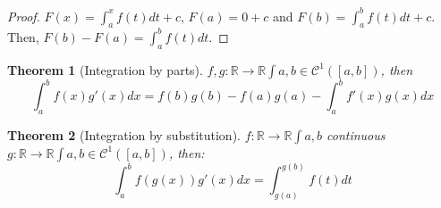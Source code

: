 \documentclass{article}
\newcommand{\fOnR}[1]{#1 : \mathbb{R} \rightarrow \mathbb{R}}
\newcommand{\intcc}[1]{\left[#1\right]}
\theoremstyle{definition}
\theoremstyle{definition}
\theoremstyle{plain}
\newtheorem{theorem}{Theorem}[section]
\theoremstyle{plain}
\theoremstyle{plain}
\theoremstyle{plain}
\theoremstyle{definition}
\theoremstyle{remark}
\theoremstyle{remark}
\theoremstyle{remark}
\theoremstyle{remark}
\newcommand{\C}{\mathcal{C}}
\begin{document}
\begin{proof}
  $F(x) = \int_a^x f(t) dt + c$, $F(a) = 0 + c$ and $F(b) = \int_a^b f(t) dt + c$. Then, $F(b) - F(a) = \int_a^b f(t) dt$.
\end{proof}



\begin{theorem}[Integration by parts]
  $\fOnR{f,g}{\int{a,b}} \in \C^1(\intcc{a,b})$, then
  \[
  \int_a^b f(x) g'(x) dx = f(b)g(b) - f(a)g(a) - \int_a^b f'(x)g(x) dx
  \]
\end{theorem}


\begin{theorem}[Integration by substitution]
  $\fOnR{f}{\int{a,b}}$ continuous $\fOnR{g}{\int{a,b}} \in \C^1(\intcc{a,b})$, then:
  \[
    \int_a^b f(g(x))g'(x) dx = \int_{g(a)}^{g(b)} f(t) dt
  \]
\end{theorem}




\end{document}
